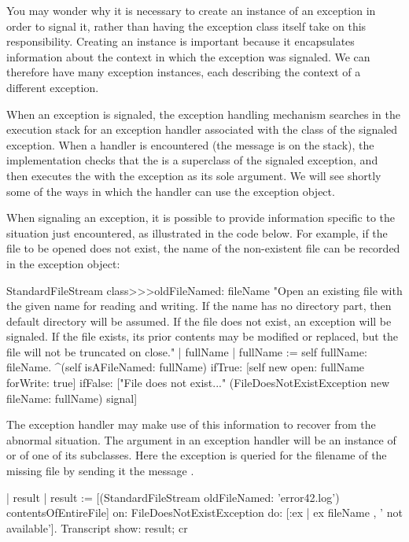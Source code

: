 \documentclass[a4paper,10pt,twoside]{book}
\begin{document}
You may wonder why it is necessary to create an instance of an exception in order to signal it, rather than having the exception class itself take on this responsibility. Creating an instance is important because it encapsulates information about the context in which the exception was signaled. We can therefore have many exception instances, each describing the context of a different exception.

When an exception is signaled, the exception handling mechanism searches in the execution stack for an exception handler associated with the class of the signaled exception. When a handler is encountered (\ie the message  is on the stack),
the implementation checks that the  is a superclass of the signaled exception, and then executes the  with the exception as its sole argument. We will see shortly some of the ways in which the handler can use the exception object.

When signaling an exception, it is possible to provide information specific to the situation just encountered, as illustrated in the code below. 
For example, if the file to be opened does not exist, the name of the non-existent file can be recorded in the exception object:

\begin{code}{}
StandardFileStream class>>>oldFileNamed: fileName
	"Open an existing file with the given name for reading and writing. If the name has no directory part, then default directory will be assumed. If the file does not exist, an exception will be signaled. If the file exists, its prior contents may be modified or replaced, but the file will not be truncated on close."
	| fullName |
	fullName := self fullName: fileName.
	^(self isAFileNamed: fullName)
		ifTrue: [self new open: fullName forWrite: true]
		ifFalse: ["File does not exist..."
			(FileDoesNotExistException new fileName: fullName) signal]
\end{code}

The exception handler may make use of this information to recover from the abnormal situation. The argument  in an exception handler \ct{[:ex | ...]} will be an instance of  or of one of its subclasses. Here the exception is queried for the filename of the missing file by sending it the message .

\begin{code}{}
| result |
result := [(StandardFileStream oldFileNamed: 'error42.log') contentsOfEntireFile]
	on: FileDoesNotExistException
	do: [:ex | ex fileName , ' not available'].
Transcript show: result; cr
\end{code}
\end{document}
